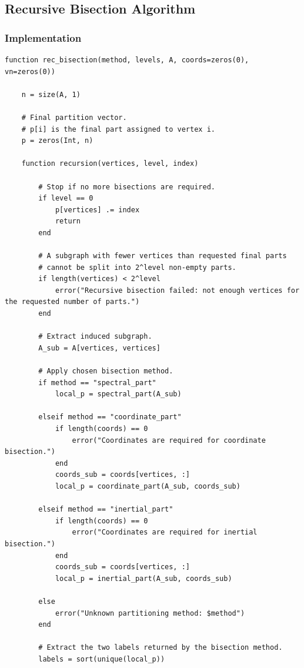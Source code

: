 \documentclass[unicode,10pt,a4paper,oneside,numbers=endperiod,openany]{scrartcl}
\begin{document}
\newpage
\subsection{Recursive Bisection Algorithm}
\subsubsection{Implementation}
\begin{lstlisting}[style=grayverbatim, caption={Recursive Bisection algorithm}, label={lst:recursive_bisection}]
function rec_bisection(method, levels, A, coords=zeros(0), vn=zeros(0))

    n = size(A, 1)

    # Final partition vector.
    # p[i] is the final part assigned to vertex i.
    p = zeros(Int, n)

    function recursion(vertices, level, index)

        # Stop if no more bisections are required.
        if level == 0
            p[vertices] .= index
            return
        end

        # A subgraph with fewer vertices than requested final parts
        # cannot be split into 2^level non-empty parts.
        if length(vertices) < 2^level
            error("Recursive bisection failed: not enough vertices for the requested number of parts.")
        end

        # Extract induced subgraph.
        A_sub = A[vertices, vertices]

        # Apply chosen bisection method.
        if method == "spectral_part"
            local_p = spectral_part(A_sub)

        elseif method == "coordinate_part"
            if length(coords) == 0
                error("Coordinates are required for coordinate bisection.")
            end
            coords_sub = coords[vertices, :]
            local_p = coordinate_part(A_sub, coords_sub)

        elseif method == "inertial_part"
            if length(coords) == 0
                error("Coordinates are required for inertial bisection.")
            end
            coords_sub = coords[vertices, :]
            local_p = inertial_part(A_sub, coords_sub)

        else
            error("Unknown partitioning method: $method")
        end

        # Extract the two labels returned by the bisection method.
        labels = sort(unique(local_p))


\end{lstlisting}
\end{document}
